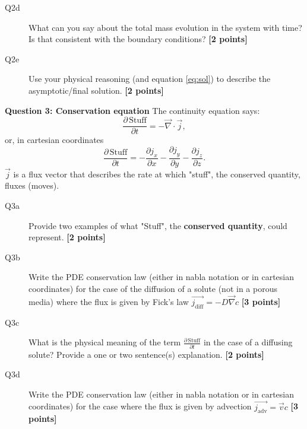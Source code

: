 \documentclass{article}
\begin{document}
\begin{description}
\item [Q2d] What can you say about the total mass evolution in the system with time? Is that consistent with the boundary conditions? \textbf{[2 points]}
\vspace{2cm}

\item [Q2e] Use your physical reasoning (and equation \ref{eq:sol}) to describe the asymptotic/final solution. \textbf{[2 points]}
\vspace{2cm}

\end{description}

\textbf{Question 3: Conservation equation}
The continuity equation says:
\begin{equation}
\frac{\partial \, \mathrm{Stuff}}{\partial t} = - \overrightarrow{\nabla } \cdot\overrightarrow{j},
\end{equation} or, in cartesian coordinates
\begin{equation}
\frac{\partial \, \mathrm{Stuff}}{\partial t} = - \frac{\partial j_x}{\partial x} - \frac{\partial j_y}{\partial y} - \frac{\partial j_z}{\partial z}.
\end{equation} $ \overrightarrow{j} $ is a flux vector that describes the rate at which "stuff", the conserved quantity, fluxes (moves).


\begin{description}
\item [Q3a] Provide two examples of what "Stuff", the \textbf{conserved quantity}, could represent. \textbf{[2 points]}
\vspace{2cm}

\item [Q3b] Write the PDE conservation law (either in nabla notation or in cartesian coordinates) for the case of the diffusion of a solute (not in a porous media) where the flux is given by Fick's law $ \overrightarrow{j_{\mathrm{diff}}} = - D \overrightarrow{\nabla} c$ \textbf{[3 points]}
\vspace{2cm}


\item [Q3c] What is the physical meaning of the term $\frac{\partial \, \mathrm{Stuff}}{\partial t}$ in the case of a diffusing solute? Provide a one or two sentence(s) explanation. \textbf{[2 points]}
\vspace{2cm}

\item [Q3d] Write the PDE conservation law (either in nabla notation or in cartesian coordinates) for the case where the flux is given by advection $ \overrightarrow{j_{\mathrm{adv}}} = \overrightarrow{v} c$ \textbf{[3 points]}
\vspace{2cm}

\end{description}
\end{document}
